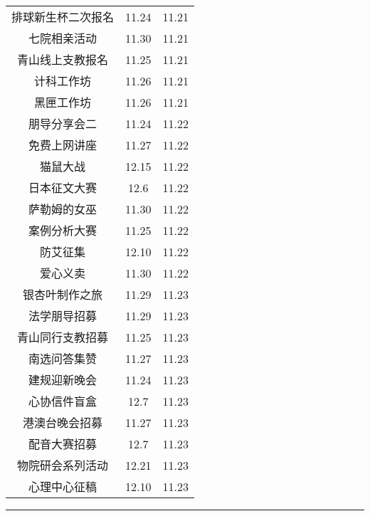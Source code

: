\documentclass[letterpaper, 12pt]{article}
\begin{document}
\begin{multicols}{2}
{\begin{longtable}{|c|c|c|}
    排球新生杯二次报名 & 11.24 & 11.21\\
    七院相亲活动 & 11.30 & 11.21\\
    青山线上支教报名 & 11.25 & 11.21\\
    计科工作坊 & 11.26 & 11.21\\
    黑匣工作坊 & 11.26 & 11.21\\
    朋导分享会二 & 11.24 & 11.22\\
    免费上网讲座 & 11.27 & 11.22\\
    猫鼠大战 & 12.15 & 11.22\\
    日本征文大赛 & 12.6 & 11.22\\
    萨勒姆的女巫 & 11.30 & 11.22\\
    案例分析大赛 & 11.25 & 11.22\\
    防艾征集 & 12.10 & 11.22\\
    爱心义卖 & 11.30 & 11.22\\
    银杏叶制作之旅 & 11.29 & 11.23\\
    法学朋导招募 & 11.29 & 11.23\\
    青山同行支教招募 & 11.25 & 11.23\\
    南选问答集赞 & 11.27 & 11.23\\
    建规迎新晚会 & 11.24 & 11.23\\
    心协信件盲盒 & 12.7 & 11.23\\
    港澳台晚会招募 & 11.27 & 11.23\\
    配音大赛招募 & 12.7 & 11.23\\
    物院研会系列活动 & 12.21 & 11.23\\
    心理中心征稿 & 12.10 & 11.23\\
    \hline
\end{longtable}
\unskip
\unpenalty
\unpenalty}\unvbox\colbbox
\end{multicols}
\hrule
\pagebreak
\end{document}
